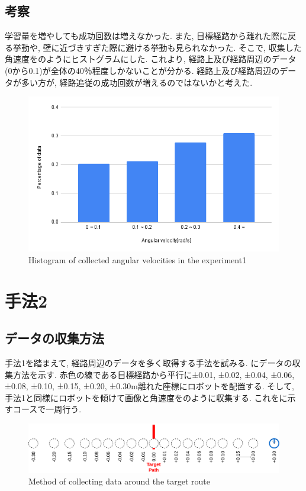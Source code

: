 \newpage
\subsection{考察}
学習量を増やしても成功回数は増えなかった.  また, 目標経路から離れた際に戻る挙動や, 壁に近づきすぎた際に避ける挙動も見られなかった. そこで, 収集した角速度をのようにヒストグラムにした. これより, 経路上及び経路周辺のデータ(0から0.1)が全体の40％程度しかないことが分かる. 経路上及び経路周辺のデータが多い方が, 経路追従の成功回数が増えるのではないかと考えた. 

\begin{figure}[h]
  \centering
  \includegraphics[keepaspectratio, scale=0.6]{images/exp1.png}
  \caption{Histogram of collected angular velocities in the experiment1}
  \label{Fig:exp1}
  \end{figure}

\newpage
\section{手法2}

\subsection{データの収集方法}
手法1を踏まえて, 経路周辺のデータを多く取得する手法を試みる. にデータの収集方法を示す. 赤色の線である目標経路から平行に±0.01, ±0.02, ±0.04, ±0.06, ±0.08, ±0.10, ±0.15, ±0.20, ±0.30m離れた座標にロボットを配置する. そして, 手法1と同様にロボットを傾けて画像と角速度をのように収集する. これをに示すコースで一周行う. 

\begin{figure}[h]
  \centering
  \includegraphics[keepaspectratio, scale=0.18]{images/collect-data.png}
  \caption{Method of collecting data around the target route}
  \label{Fig:collect-data}
  \end{figure}

